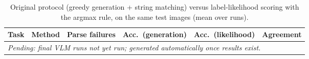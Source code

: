 \begin{table}[t]
\centering
\scriptsize
\caption{Original protocol (greedy generation + string matching) versus label-likelihood scoring with the argmax rule, on the same test images (mean over runs).}
\label{tab:generation}
\begin{tabular}{clcccc}
\toprule
Task & Method & Parse failures & Acc.\ (generation) & Acc.\ (likelihood) & Agreement\\
\midrule
\multicolumn{6}{l}{\textit{Pending: final VLM runs not yet run; generated automatically once results exist.}}\\
\bottomrule
\end{tabular}
\end{table}
